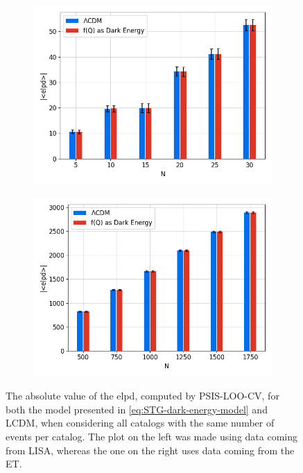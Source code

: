 \begin{figure}[h!]
    \centering
    \begin{subfigure}[b]{0.495\textwidth}
        \centering
        \includegraphics[width=\textwidth]{figures/elpd-LISA.png}
    \end{subfigure}
    \hfill
    \begin{subfigure}[b]{0.495\textwidth}
        \centering
        \includegraphics[width=\textwidth]{figures/elpd-ET.png}
    \end{subfigure}
    \caption[The absolute value of the average of the elpd, computed by PSIS-LOO-CV, for a model of $f(Q)$ as dark energy and $\Lambda$CDM, when considering all catalogs with the same number of events per catalog. The plot on the left was made using data coming from LISA, whereas the one on the right uses data coming from the ET.]
    {The absolute value of the \gls{elpd}, computed by \gls{PSIS-LOO-CV}, for both the model presented in \cref{eq:STG-dark-energy-model} and \gls{LCDM}, when considering all catalogs with the same number of events per catalog. The plot on the left was made using data coming from \gls{LISA}, whereas the one on the right uses data coming from the \gls{ET}.}
    \label{fig:elpd}
\end{figure}

